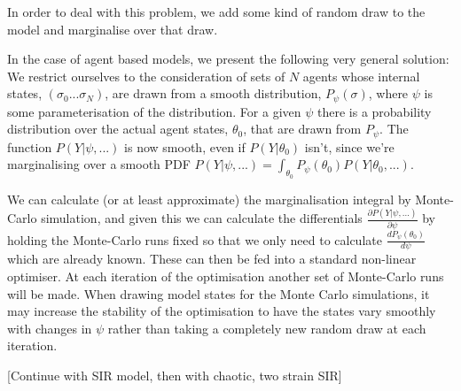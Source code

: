 \documentclass[letterpaper,twocolumn,10pt]{article}
\begin{document}
In order to deal with this problem, we add some kind of random draw to the model and marginalise over that draw.

In the case of agent based models, we present the following very general solution: We restrict ourselves to the consideration of sets of $N$ agents whose internal states, $(\sigma_0...\sigma_N)$, are drawn from a smooth distribution, $P_\psi(\sigma)$, where $\psi$ is some parameterisation of the distribution. For a given $\psi$ there is a probability distribution over the actual agent states, $\theta_0$, that are drawn from $P_\psi$. The function $P(Y|\psi, ... )$ is now smooth, even if $P(Y|\theta_0)$ isn't, since we're marginalising over a smooth PDF $P(Y|\psi, ... ) = \int_{\theta_0} P_\psi(\theta_0)P(Y|\theta_0, ... )$.

We can calculate (or at least approximate) the marginalisation integral by Monte-Carlo simulation, and given this we can calculate the differentials $\frac{\partial P(Y|\psi,...)}{\partial \psi}$ by holding the Monte-Carlo runs fixed so that we only need to calculate $\frac{dP_\psi(\theta_0)}{d\psi}$ which are already known. These can then be fed into a standard non-linear optimiser. At each iteration of the optimisation another set of Monte-Carlo runs will be made. When drawing model states for the Monte Carlo simulations, it may increase the stability of the optimisation to have the states vary smoothly with changes in $\psi$ rather than taking a completely new random draw at each iteration.

[Continue with SIR model, then with chaotic, two strain SIR]
\end{document}
